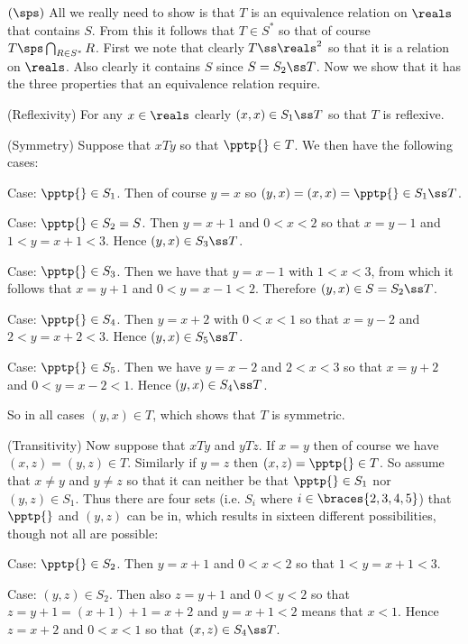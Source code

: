 {{    $(\sps)$ All we really need to show is that $T$ is an equivalence relation on $\reals$ that contains $S$.
    From this it follows that $T \in S^*$ so that of course $T \sps \bigcap_{R \in S^*} R$.
    First we note that clearly $T \ss \reals^2$ so that it is a relation on $\reals$.
    Also clearly it contains $S$ since $S = S_2 \ss T$.
    Now we show that it has the three properties that an equivalence relation require.

    (Reflexivity) For any $x \in \reals$ clearly $(x,x) \in S_1 \ss T$ so that $T$ is reflexive.

    (Symmetry) Suppose that $xTy$ so that $\pptp{} \in T$.
    We then have the following cases:

    Case: $\pptp{} \in S_1$.
    Then of course $y = x$ so $(y,x) = (x,x) = \pptp{} \in S_1 \ss T$.

    Case: $\pptp{} \in S_2 = S$.
    Then $y = x+1$ and $0<x<2$ so that $x = y-1$ and $1 < y=x+1 < 3$.
    Hence $(y,x) \in S_3 \ss T$.

    Case: $\pptp{} \in S_3$.
    Then we have that $y = x - 1$ with $1 < x < 3$, from which it follows that $x = y + 1$ and $0 < y = x-1 < 2$.
    Therefore $(y,x) \in S = S_2 \ss T$.

    Case: $\pptp{} \in S_4$.
    Then $y = x+2$ with $0 < x < 1$ so that $x = y-2$ and $2 < y=x+2 < 3$.
    Hence $(y,x) \in S_5 \ss T$.

    Case: $\pptp{} \in S_5$.
    Then we have $y = x-2$ and $2 < x < 3$ so that $x = y+2$ and $0 < y=x-2 < 1$.
    Hence $(y,x) \in S_4 \ss T$.

    So in all cases $(y,x) \in T$, which shows that $T$ is symmetric.

    (Transitivity) Now suppose that $xTy$ and $yTz$.
    If $x = y$ then of course we have $(x,z) = (y,z) \in T$.
    Similarly if $y = z$ then $(x,z) = \pptp{} \in T$.
    So assume that $x \neq y$ and $y \neq z$ so that it can neither be that $\pptp{} \in S_1$ nor $(y,z) \in S_1$.
    Thus there are four sets (i.e. $S_i$ where $i \in \braces{2,3,4,5}$) that $\pptp{}$ and $(y,z)$ can be in, which results in sixteen different possibilities, though not all are possible:

    Case: $\pptp{} \in S_2$.
    Then $y=x+1$ and $0 < x < 2$ so that $1 < y = x+1 < 3$.
    \begin{indpar}
      Case: $(y,z) \in S_2$.
      Then also $z=y+1$ and $0 < y < 2$ so that $z = y+1 = (x+1)+1 = x+2$ and $y = x+1 < 2$ means that $x < 1$.
      Hence $z = x+2$ and $0 < x < 1$ so that $(x,z) \in S_4 \ss T$.


\end{indpar}}}

